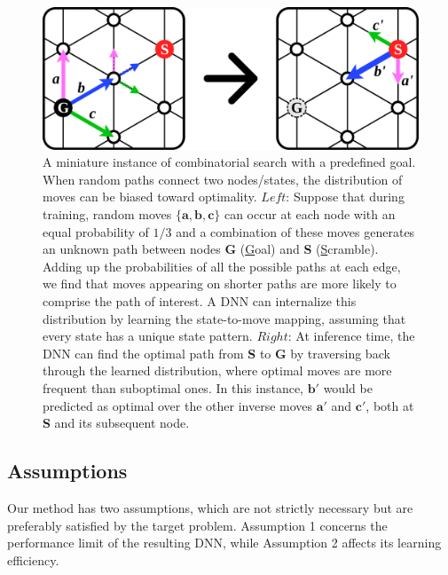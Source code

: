 \documentclass[nohyperref]{article}
\theoremstyle{plain}
\theoremstyle{definition}
\theoremstyle{remark}
\begin{document}
\begin{figure}[tb]
    \centering
    \includegraphics[width=1.0\columnwidth]{figures/method.example.pdf}
    \vspace{-1em}
    \caption{
        A miniature instance of combinatorial search with a predefined goal.
        When random paths connect two nodes/states, the distribution of moves can be biased toward optimality.
        $Left$:
        Suppose that during training, random moves $\{\bm{a}, \bm{b}, \bm{c}\}$ can occur at each node with an equal probability of $1/3$ and a combination of these moves generates an unknown path between nodes \textbf{G} (\underline{G}oal) and \textbf{S} (\underline{S}cramble).
        Adding up the probabilities of all the possible paths at each edge, we find that moves appearing on shorter paths are more likely to comprise the path of interest.
        A DNN can internalize this distribution by learning the state-to-move mapping, assuming that every state has a unique state pattern.
        $Right$:
        At inference time, the DNN can find the optimal path from \textbf{S} to \textbf{G} by traversing back through the learned distribution, where optimal moves are more frequent than suboptimal ones.
        In this instance, $\bm{b'}$ would be predicted as optimal over the other inverse moves $\bm{a'}$ and $\bm{c'}$, both at \textbf{S} and its subsequent node.
    }
    \label{fig:miniature}
    \vspace{-2mm}
\end{figure}


\subsection{Assumptions}
Our method has two assumptions, which are not strictly necessary but are preferably satisfied by the target problem.
Assumption 1 concerns the performance limit of the resulting DNN, while Assumption 2 affects its learning efficiency.
\end{document}
